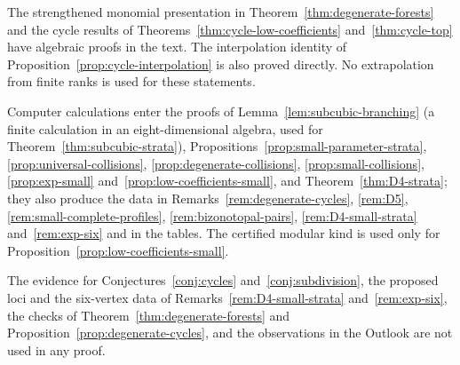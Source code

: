 \documentclass[reqno]{article}
\theoremstyle{plain} %
\theoremstyle{definition}
\theoremstyle{remark}
\numberwithin{equation}{section}
\begin{document}
The strengthened monomial presentation in
Theorem~\ref{thm:degenerate-forests} and the cycle results of
Theorems~\ref{thm:cycle-low-coefficients} and~\ref{thm:cycle-top} have
algebraic proofs in the text. The interpolation identity of
Proposition~\ref{prop:cycle-interpolation} is also proved directly. No
extrapolation from finite ranks is used for these statements.

Computer calculations enter the proofs of
Lemma~\ref{lem:subcubic-branching} (a finite calculation in an
eight-dimensional algebra, used for Theorem~\ref{thm:subcubic-strata}),
Propositions~\ref{prop:small-parameter-strata},
\ref{prop:universal-collisions}, \ref{prop:degenerate-collisions},
\ref{prop:small-collisions}, \ref{prop:exp-small}
and~\ref{prop:low-coefficients-small}, and Theorem~\ref{thm:D4-strata};
they also produce the data in Remarks~\ref{rem:degenerate-cycles},
\ref{rem:D5}, \ref{rem:small-complete-profiles},
\ref{rem:bizonotopal-pairs}, \ref{rem:D4-small-strata}
and~\ref{rem:exp-six} and in the tables. The certified modular kind is
used only for Proposition~\ref{prop:low-coefficients-small}.

The evidence for Conjectures~\ref{conj:cycles} and~\ref{conj:subdivision},
the proposed loci and the six-vertex data of
Remarks~\ref{rem:D4-small-strata} and~\ref{rem:exp-six}, the checks of
Theorem~\ref{thm:degenerate-forests} and
Proposition~\ref{prop:degenerate-cycles}, and the observations in the Outlook are not used in any proof.
\end{document}
